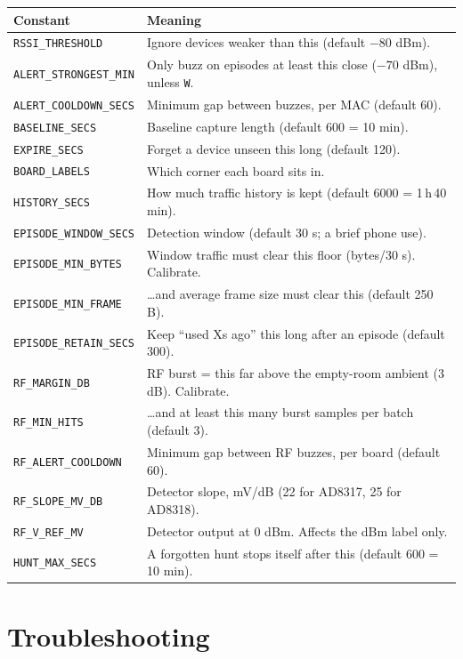 \documentclass[11pt]{article}
\begin{document}
\begin{center}
\begin{tabular}{@{}ll@{}}
\toprule
\textbf{Constant} & \textbf{Meaning}\\
\midrule
\texttt{RSSI\_THRESHOLD} & Ignore devices weaker than this (default $-80$ dBm).\\
\texttt{ALERT\_STRONGEST\_MIN} & Only buzz on episodes at least this close ($-70$ dBm), unless \texttt{W}.\\
\texttt{ALERT\_COOLDOWN\_SECS} & Minimum gap between buzzes, per MAC (default 60).\\
\texttt{BASELINE\_SECS} & Baseline capture length (default 600 = 10 min).\\
\texttt{EXPIRE\_SECS} & Forget a device unseen this long (default 120).\\
\texttt{BOARD\_LABELS} & Which corner each board sits in.\\
\texttt{HISTORY\_SECS} & How much traffic history is kept (default 6000 = 1\,h\,40\,min).\\
\texttt{EPISODE\_WINDOW\_SECS} & Detection window (default 30 s; a brief phone use).\\
\texttt{EPISODE\_MIN\_BYTES} & Window traffic must clear this floor (bytes/30 s). Calibrate.\\
\texttt{EPISODE\_MIN\_FRAME} & \dots and average frame size must clear this (default 250 B).\\
\texttt{EPISODE\_RETAIN\_SECS} & Keep ``used Xs ago'' this long after an episode (default 300).\\
\texttt{RF\_MARGIN\_DB} & RF burst = this far above the empty-room ambient (3 dB). Calibrate.\\
\texttt{RF\_MIN\_HITS} & \dots and at least this many burst samples per batch (default 3).\\
\texttt{RF\_ALERT\_COOLDOWN} & Minimum gap between RF buzzes, per board (default 60).\\
\texttt{RF\_SLOPE\_MV\_DB} & Detector slope, mV/dB (22 for AD8317, 25 for AD8318).\\
\texttt{RF\_V\_REF\_MV} & Detector output at 0 dBm. Affects the dBm label only.\\
\texttt{HUNT\_MAX\_SECS} & A forgotten hunt stops itself after this (default 600 = 10 min).\\
\bottomrule
\end{tabular}
\end{center}

\section{Troubleshooting}
\end{document}
